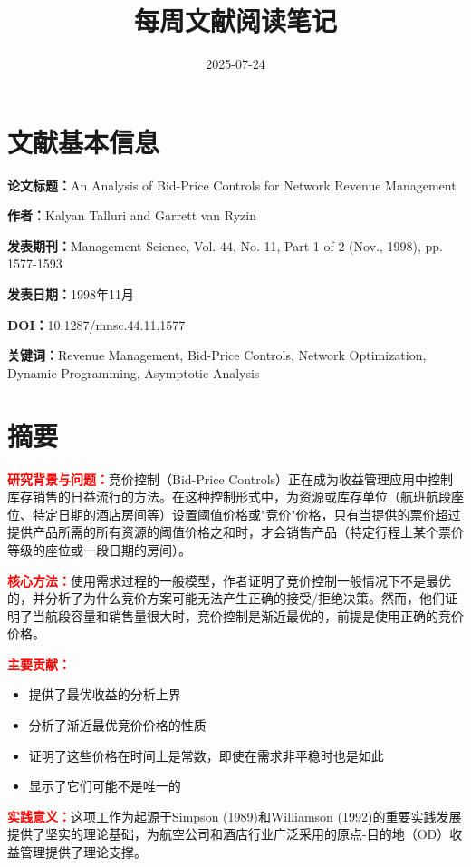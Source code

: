 \documentclass[
  10pt
]{article}
\author{}
\date{2025-07-24}
\begin{document}
\title{\textbf{每周文献阅读笔记}}
\maketitle

\section{文献基本信息}

\textbf{论文标题：}An Analysis of Bid-Price Controls for Network Revenue Management

\textbf{作者：}Kalyan Talluri and Garrett van Ryzin

\textbf{发表期刊：}Management Science, Vol. 44, No. 11, Part 1 of 2 (Nov., 1998), pp. 1577-1593

\textbf{发表日期：}1998年11月

\textbf{DOI：}10.1287/mnsc.44.11.1577

\textbf{关键词：}Revenue Management, Bid-Price Controls, Network Optimization, Dynamic Programming, Asymptotic Analysis

\section{摘要}

\textcolor{red}{\textbf{研究背景与问题：}}竞价控制（Bid-Price Controls）正在成为收益管理应用中控制库存销售的日益流行的方法。在这种控制形式中，为资源或库存单位（航班航段座位、特定日期的酒店房间等）设置阈值价格或"竞价"价格，只有当提供的票价超过提供产品所需的所有资源的阈值价格之和时，才会销售产品（特定行程上某个票价等级的座位或一段日期的房间）。

\textcolor{red}{\textbf{核心方法：}}使用需求过程的一般模型，作者证明了竞价控制一般情况下不是最优的，并分析了为什么竞价方案可能无法产生正确的接受/拒绝决策。然而，他们证明了当航段容量和销售量很大时，竞价控制是渐近最优的，前提是使用正确的竞价价格。

\textcolor{red}{\textbf{主要贡献：}}
\begin{itemize}
\item 提供了最优收益的分析上界
\item 分析了渐近最优竞价价格的性质
\item 证明了这些价格在时间上是常数，即使在需求非平稳时也是如此
\item 显示了它们可能不是唯一的
\end{itemize}

\textcolor{red}{\textbf{实践意义：}}这项工作为起源于Simpson (1989)和Williamson (1992)的重要实践发展提供了坚实的理论基础，为航空公司和酒店行业广泛采用的原点-目的地（OD）收益管理提供了理论支撑。
\end{document}
